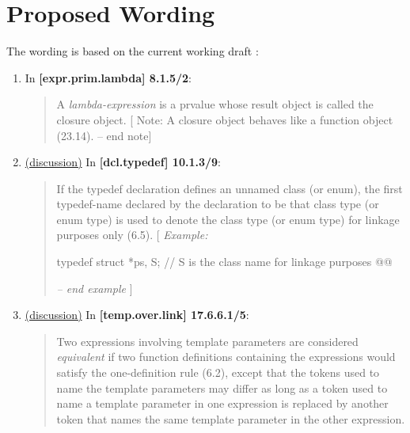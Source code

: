 \documentclass{wg21}
\begin{document}
\section{Proposed Wording}
The wording is based on the current working draft \cite{N4700}:

\begin{enumerate}
  \item \label{wording.remove}
    In \textbf{[expr.prim.lambda] 8.1.5/2}:
    \begin{quote}
      A \textit{lambda-expression} is a prvalue whose result object is called
      the closure object.  [ Note: A closure object behaves
      like a function object (23.14). -- end note]
    \end{quote}

  \item \label{wording.non-template} \hyperref[discussion.non-template]{(discussion)}
    In \textbf{[dcl.typedef] 10.1.3/9}:
    \begin{quote}
      If the typedef declaration defines an unnamed class (or enum), the first
      typedef-name declared by the declaration to be that class type (or enum type)
      is used to denote the class type (or enum type) for linkage purposes only (6.5).
      [ \textit{Example:}
\begin{codeblock}
typedef struct { } *ps, S; // S is the class name for linkage purposes
@@
\end{codeblock}
      \textit{-- end example} ]
    \end{quote}
  \item \label{wording.template} \hyperref[discussion.template]{(discussion)}
    In \textbf{[temp.over.link] 17.6.6.1/5}:
    \begin{quote}
      Two expressions involving template parameters are considered \textit{equivalent}
      if two function definitions containing the expressions would satisfy the
      one-definition rule (6.2), except that the tokens used to name the template
      parameters may differ as long as a token used to name a template parameter
      in one expression is replaced by another token that names the same template
      parameter in the other expression. 
    \end{quote}


\end{enumerate}
\end{document}
